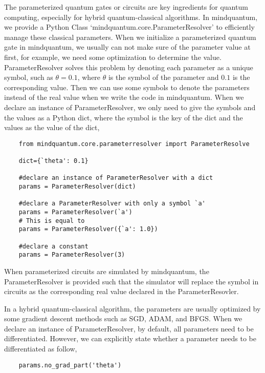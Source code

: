 


The parameterized quantum gates or circuits are key ingredients for quantum computing, especially for hybrid quantum-classical algorithms.
In mindquantum, we provide a Python Class `mindquantum.core.ParameterResolver' to efficiently manage these classical parameters.
When we initialize a parameterized quantum gate in mindquantum, we usually can not make sure of the parameter value at first, for example, we need some optimization to determine the value.
ParameterResolver solves this problem by
denoting each parameter as a unique symbol, such as $\theta=0.1$, where $\theta$ is the symbol of the parameter and $0.1$ is the corresponding value.
Then we can use some symbols to denote the parameters instead of the real value when we write the code in mindquantum.
When we declare an instance of ParameterResolver, we only need to give the symbols and the values as a Python dict, where the symbol is the key of the dict and the values as the value of the dict,
\begin{lstlisting}
    from mindquantum.core.parameterresolver import ParameterResolve
    
    dict={`theta': 0.1}
    
    #declare an instance of ParameterResolver with a dict
    params = ParameterResolver(dict)

    #declare a ParameterResolver with only a symbol `a'
    params = ParameterResolver(`a')
    # This is equal to 
    params = ParameterResolver({`a': 1.0})

    #declare a constant
    params = ParameterResolver(3)
\end{lstlisting}
When parameterized circuits are simulated by mindquantum, the ParameterResolver is provided such that the simulator will replace the symbol in circuits as the corresponding real value declared in the ParameterResovler.

In a hybrid quantum-classical algorithm, the parameters are usually optimized by some gradient descent methods such as SGD, ADAM, and BFGS.
When we declare an instance of ParameterResolver, by default, all parameters need to be differentiated.
However, we can explicitly state whether a parameter needs to be differentiated as follow,
\begin{lstlisting}
    params.no_grad_part('theta')
\end{lstlisting}

